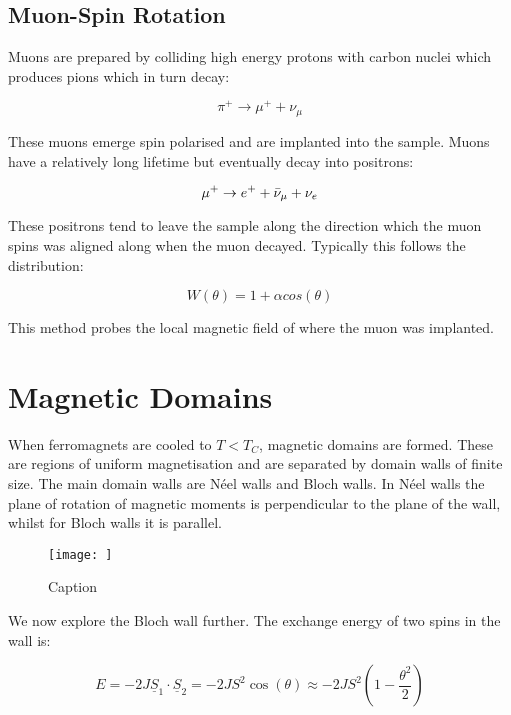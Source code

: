 \subsection{Muon-Spin Rotation}

Muons are prepared by colliding high energy protons with carbon nuclei which produces pions which in turn decay:

\begin{equation}
    \pi^+ \rightarrow \mu^+ + \nu_\mu
    \label{PionDecay}
\end{equation}

\noindent These muons emerge spin polarised and are implanted into the sample. Muons have a relatively long lifetime but eventually decay into positrons:

\begin{equation}
    \mu^+ \rightarrow e^+ + \Bar{\nu}_\mu + \nu_e
    \label{MuonDecay}
\end{equation}

\noindent These positrons tend to leave the sample along the direction which the muon spins was aligned along when the muon decayed. Typically this follows the distribution:

\begin{equation}
    W(\theta) = 1 + \alpha cos(\theta)
    \label{PositronDistribution}
\end{equation}

\noindent This method probes the local magnetic field of where the muon was implanted.

\section{Magnetic Domains}

When ferromagnets are cooled to $T < T_C$, magnetic domains are formed. These are regions of uniform magnetisation and are separated by domain walls of finite size.
The main domain walls are N\'eel walls and Bloch walls. In N\'eel walls the plane of rotation of magnetic moments is perpendicular to the plane of the wall, whilst for Bloch walls it is parallel.

\begin{figure}
    \centering
    \texttt{[image: ]}
    \caption{Caption}
    \label{fig:enter-label}
\end{figure}

\noindent We now explore the Bloch wall further. The exchange energy of two spins in the wall is:

\begin{equation}
    E = -2J\underline{S}_1 \cdot \underline{S}_2 = -2JS^2\cos(\theta) \approx -2JS^2(1 - \frac{\theta^2}{2})
    \label{ExchangeEnergy2SpinBlochWall}
\end{equation}

